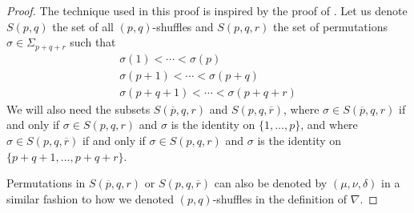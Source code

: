 \documentclass[TFM.tex]{subfiles}
\begin{document}
\begin{proof}
The technique used in this proof is inspired by the proof of \cite[Lemma 2.9]{Madsen}. Let us denote $S(p,q)$ the set of all $(p,q)$-shuffles and $S(p,q,r)$ the set of permutations $\sigma\in\Sigma_{p+q+r}$ such that 
\begin{gather*}
\sigma(1)<\cdots<\sigma(p)\\
\sigma(p+1)<\cdots<\sigma(p+q)\\
\sigma(p+q+1)<\cdots<\sigma(p+q+r)
\end{gather*}
We will also need the subsets $S(\overline{p},q,r)$ and $S(p,q,\overline{r})$, where $\sigma\in S(\overline{p},q,r)$ if and only if $\sigma\in S(p,q,r)$ and $\sigma$ is the identity on $\{1,\dots, p\}$, and where $\sigma\in S(p,q,\overline{r})$ if and only if $\sigma\in S(p,q,r)$ and $\sigma$ is the identity on $\{p+q+1,\dots, p+q+r\}$.

Permutations in $S(\overline{p},q,r)$ or $S(p,q,\overline{r})$ can also be denoted by $(\mu,\nu,\delta)$ in a similar fashion to how we denoted $(p,q)$-shuffles in the definition of $\nabla$. 


\end{proof}
\end{document}

